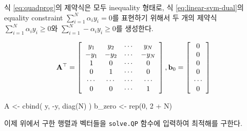 \documentclass[
]{book}
\newenvironment{Shaded}{\begin{snugshade}}{\end{snugshade}}
\newcommand{\AttributeTok}[1]{\textcolor[rgb]{0.77,0.63,0.00}{#1}}
\newcommand{\DecValTok}[1]{\textcolor[rgb]{0.00,0.00,0.81}{#1}}
\newcommand{\FunctionTok}[1]{\textcolor[rgb]{0.00,0.00,0.00}{#1}}
\newcommand{\NormalTok}[1]{#1}
\newcommand{\OtherTok}[1]{\textcolor[rgb]{0.56,0.35,0.01}{#1}}
\newcommand{\SpecialCharTok}[1]{\textcolor[rgb]{0.00,0.00,0.00}{#1}}
\begin{document}
\begin{Shaded}
\end{Shaded}

식 \eqref{eq:quadprog}의 제약식은 모두 inequality 형태로, 식 \eqref{eq:linear-svm-dual}의 equality constraint \(\sum_{i = 1}^{N} \alpha_i y_i = 0\)를 표현하기 위해서 두 개의 제약식 \(\sum_{i = 1}^{N} \alpha_i y_i \ge 0\)와 \(\sum_{i = 1}^{N} - \alpha_i y_i \ge 0\)를 생성한다.

\begin{equation*}
\mathbf{A}^\top = \left[ 
\begin{array}{c c c c}
y_1 & y_2 & \cdots & y_N\\
-y_1 & -y_2 & \cdots & -y_N\\
1 & 0 & \cdots & 0\\
0 & 1 & \cdots & 0\\
\cdots & \cdots & \cdots & \cdots \\
0 & 0 & \cdots & 1
\end{array}
\right],
\mathbf{b}_0 = \left[ \begin{array}{c}
0 \\ 0 \\ 0 \\ 0 \\ \cdots \\ 0
\end{array}
\right]
\end{equation*}

\begin{Shaded}
\begin{Highlighting}[]
\NormalTok{A }\OtherTok{\textless{}{-}} \FunctionTok{cbind}\NormalTok{(}
\NormalTok{  y,}
  \SpecialCharTok{{-}}\NormalTok{y,}
  \FunctionTok{diag}\NormalTok{(N)}
\NormalTok{)}
\NormalTok{b\_zero }\OtherTok{\textless{}{-}} \FunctionTok{rep}\NormalTok{(}\DecValTok{0}\NormalTok{, }\DecValTok{2} \SpecialCharTok{+}\NormalTok{ N)}
\end{Highlighting}
\end{Shaded}

이제 위에서 구한 행렬과 벡터들을 \texttt{solve.QP} 함수에 입력하여 최적해를 구한다.
\end{document}
